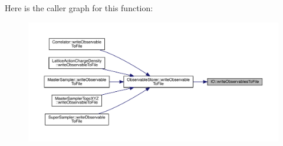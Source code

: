 Here is the caller graph for this function\+:
\nopagebreak
\begin{figure}[H]
\begin{center}
\leavevmode
\includegraphics[width=350pt]{namespace_i_o_ad8cf5aef8f60d10b80292b69a091d5ac_icgraph}
\end{center}
\end{figure}
